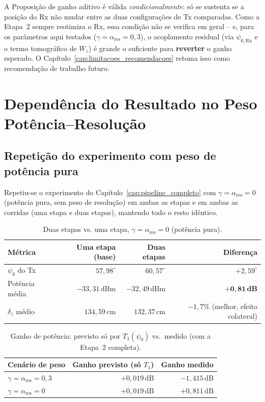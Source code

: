 \documentclass[12pt,a4paper,oneside]{book}
\newcommand{\result}[2]{%
  \begin{tcolorbox}[enhanced, breakable,
    colback=yellow!8, colframe=orange!70!black,
    fonttitle=\bfseries,
    title={\protect#1},
    attach boxed title to top left={yshift=-2mm, xshift=5mm},
    boxed title style={colback=orange!70!black}]
    #2
  \end{tcolorbox}}
\theoremstyle{definition}
\theoremstyle{remark}
\newcommand{\dz}{\delta_z}
\begin{document}
\result{Conclusão do Capítulo}{
A Proposição de ganho aditivo é válida \emph{condicionalmente}: só se
sustenta se a posição do Rx não mudar entre as duas configurações de Tx
comparadas. Como a Etapa~2 sempre reotimiza o Rx, essa condição não se
verifica em geral -- e, para os parâmetros aqui testados
($\gamma=\alpha_{\mathrm{res}}=0{,}3$), o acoplamento residual (via
$\psi_{0,\mathrm{Rx}}$ e o termo tomográfico de $W_z$) é grande o
suficiente para \textbf{reverter} o ganho esperado. O
Capítulo~\ref{cap:limitacoes_recomendacoes} retoma isso como recomendação
de trabalho futuro.
}

\chapter{Dependência do Resultado no Peso Potência--Resolução}
\label{cap:peso_gamma}

\section{Repetição do experimento com peso de potência pura}

Repetiu-se o experimento do Capítulo~\ref{cap:pipeline_completo} com
$\gamma=\alpha_{\mathrm{res}}=0$ (potência pura, sem peso de resolução) em
ambas as etapas e em ambas as corridas (uma etapa e duas etapas), mantendo
todo o resto idêntico.

\begin{table}[H]
\centering
\caption{Duas etapas vs. uma etapa, $\gamma=\alpha_{\mathrm{res}}=0$ (potência pura).}
\label{tab:pipeline_00}
\begin{tabular}{lrrr}
\toprule
Métrica & Uma etapa (base) & Duas etapas & Diferença \\
\midrule
$\psi_0$ do Tx & $57{,}98^\circ$ & $60{,}57^\circ$ & $+2{,}59^\circ$ \\
Potência média & $-33{,}31\,\mathrm{dBm}$ & $-32{,}49\,\mathrm{dBm}$ & $\mathbf{+0{,}81\,dB}$ \\
$\dz$ médio & $134{,}59\,\mathrm{cm}$ & $132{,}37\,\mathrm{cm}$ & $-1{,}7\%$ (melhor, efeito colateral) \\
\bottomrule
\end{tabular}
\end{table}

\begin{table}[H]
\centering
\caption{Ganho de potência: previsto só por $T_1(\psi_0)$ vs.\ medido (com a
Etapa~2 completa).}
\begin{tabular}{lrr}
\toprule
Cenário de peso & Ganho previsto (só $T_1$) & Ganho medido \\
\midrule
$\gamma=\alpha_{\mathrm{res}}=0{,}3$ & $+0{,}019\,\mathrm{dB}$ & $-1{,}415\,\mathrm{dB}$ \\
$\gamma=\alpha_{\mathrm{res}}=0$    & $+0{,}019\,\mathrm{dB}$ & $+0{,}811\,\mathrm{dB}$ \\
\bottomrule
\end{tabular}
\end{table}
\end{document}

